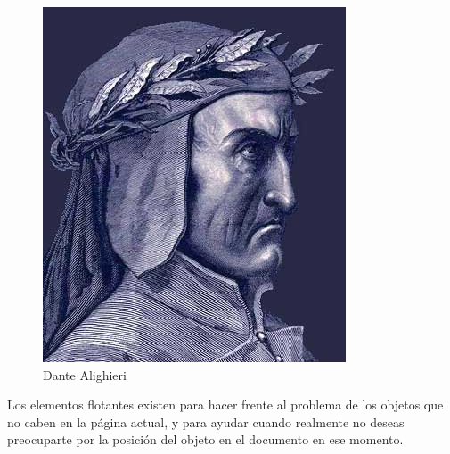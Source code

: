 \documentclass[a4paper,12pt]{article}
\begin{document}
\begin{figure}[h] 
	\centering
	\includegraphics[width=0.2\linewidth]{fig/dante}
	\caption[Dante]{Dante Alighieri}
\end{figure}

Los elementos flotantes existen para hacer frente al problema de los objetos que no caben en la página actual, y para ayudar cuando realmente no deseas preocuparte por la posición del objeto en el documento en ese momento.
\end{document}
